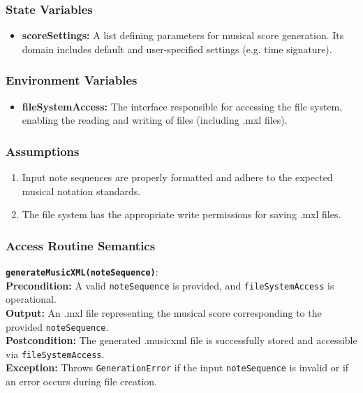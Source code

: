 \documentclass[12pt, titlepage]{article}
\begin{document}
\subsubsection{State Variables}
\begin{itemize}
    \item \textbf{scoreSettings:} A list defining parameters for musical score generation. Its domain includes default and user-specified settings (e.g. time signature).
\end{itemize}

\subsubsection{Environment Variables}
\begin{itemize}
    \item \textbf{fileSystemAccess:} The interface responsible for accessing the file system, enabling the reading and writing of files (including .mxl files).
\end{itemize}

\subsubsection{Assumptions}
\begin{enumerate}
    \item Input note sequences are properly formatted and adhere to the expected musical notation standards.
    \item The file system has the appropriate write permissions for saving .mxl files.
\end{enumerate}

\subsubsection{Access Routine Semantics}
\vspace{2mm}
\noindent \textbf{\texttt{generateMusicXML(noteSequence)}}: \\
\textbf{Precondition:} A valid \texttt{noteSequence} is provided, and \texttt{fileSystemAccess} is operational. \\
\textbf{Output:} An .mxl file representing the musical score corresponding to the provided \texttt{noteSequence}. \\
\textbf{Postcondition:} The generated .musicxml file is successfully stored and accessible via \texttt{fileSystemAccess}. \\
\textbf{Exception:} Throws \texttt{GenerationError} if the input \texttt{noteSequence} is invalid or if an error occurs during file creation.
\end{document}
